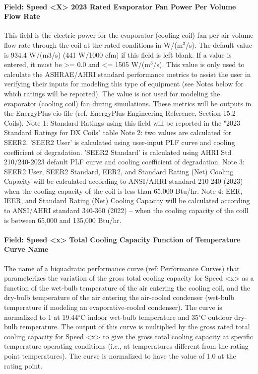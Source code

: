 \paragraph{Field: Speed \textless{}X\textgreater{} 2023 Rated Evaporator Fan Power Per Volume Flow Rate}

This field is the electric power for the evaporator (cooling coil) fan per air volume flow rate through the coil at the rated conditions in W/(m\(^{3}\)/s). The default value is 934.4 W/(m3/s) (441 W/1000 cfm) if this field is left blank. If a value is entered, it must be \textgreater{}= 0.0 and \textless{}= 1505 W/(m\(^{3}\)/s). This value is only used to calculate the ASHRAE/AHRI standard performance metrics to assist the user in verifying their inputs for modeling this type of equipment (see Notes below for which ratings will be reported).  The value is not used for modeling the evaporator (cooling coil) fan during simulations.  These metrics will be outputs in the EnergyPlus eio file (ref. EnergyPlus Engineering Reference, Section 15.2 Coils). 
Note 1: Standard Ratings using this field will be reported in the "2023 Standard Ratings for DX Coils" table
Note 2: two values are calculated for SEER2. 'SEER2 User' is calculated using user-input PLF curve and cooling coefficient of degradation. 'SEER2 Standard' is calculated using AHRI Std 210/240-2023 default PLF curve and cooling coefficient of degradation.
Note 3: SEER2 User, SEER2 Standard, EER2, and Standard Rating (Net) Cooling Capacity will be calculated according to ANSI/AHRI standard 210-240 (2023) -- when the cooling capacity of the coil is less than 65,000 Btu/hr.
Note 4: EER, IEER, and Standard Rating (Net) Cooling Capacity will be calculated according to ANSI/AHRI standard 340-360 (2022) -- when the cooling capacity of the coill is between 65,000 and 135,000 Btu/hr.

\paragraph{Field: Speed \textless{}x\textgreater{} Total Cooling Capacity Function of Temperature Curve Name}\label{field-speed-x-total-cooling-capacity-function-of-temperature-curve-name}

The name of a biquadratic performance curve (ref: Performance Curves) that parameterizes the variation of the gross total cooling capacity for Speed \textless{}x\textgreater{} as a function of the wet-bulb temperature of the air entering the cooling coil, and the dry-bulb temperature of the air entering the air-cooled condenser (wet-bulb temperature if modeling an evaporative-cooled condenser). The curve is normalized to 1 at 19.44$^\circ$C indoor wet-bulb temperature and 35$^\circ$C outdoor dry-bulb temperature. The output of this curve is multiplied by the gross rated total cooling capacity for Speed \textless{}x\textgreater{} to give the gross total cooling capacity at specific temperature operating conditions (i.e., at temperatures different from the rating point temperatures). The curve is normalized to have the value of 1.0 at the rating point.


